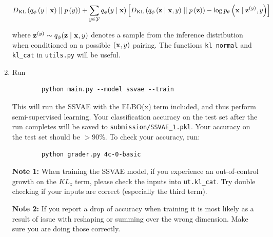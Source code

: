 \begin{enumerate}[label=(\alph*)]
    \begin{equation} \label{eq:30}
        D_{\text{KL}}\left(q_{\phi}\left(y \mid \mathbf{x}\right) \mid\mid p\left(y\right)\right) + \sum\limits_{y \in \mathcal{Y}} q_{\phi}(y \mid \mathbf{x}) \left[D_{\text{KL}}\left(q_{\phi}\left(\mathbf{z} \mid \mathbf{x}, y\right) \mid\mid p\left(\mathbf{z}\right)\right) - \log p_{\theta}\left(\mathbf{x} \mid \mathbf{z}^{(y)}, y\right)\right]
    \end{equation}

    where $\mathbf{z}^{(y)} \sim q_{\phi}(\mathbf{z} \mid \mathbf{x}, y)$ denotes a sample from the inference distribution when conditioned on a possible
    $(\mathbf{x}, y)$ pairing. The functions \texttt{kl\_normal} and \texttt{kl\_cat} in \texttt{utils.py} will be useful.

    \item {} Run 
    \begin{verbatim}
        python main.py --model ssvae --train
    \end{verbatim}

    This will run the SSVAE with the ELBO(x) term included, and thus perform 
    semi-supervised learning. Your classification accuracy on the test set after the run completes will be saved to \texttt{submission/SSVAE\_1.pkl}. Your accuracy on the test set should be $> 90\%$.
    To check your accuracy, run:
    \begin{verbatim}
        python grader.py 4c-0-basic
    \end{verbatim}

    \textbf{Note 1: }When training the SSVAE model, if you experience an out-of-control growth on the $KL_{z}$ term,
    please check the inputs into \texttt{ut.kl\_cat}. Try double checking if your inputs are correct (especially the third term). 

    \textbf{Note 2: }If you report a drop of accuracy when training it is most likely as a result of issue with reshaping or summing over the wrong dimension. Make sure you are doing those correctly.
\end{enumerate}